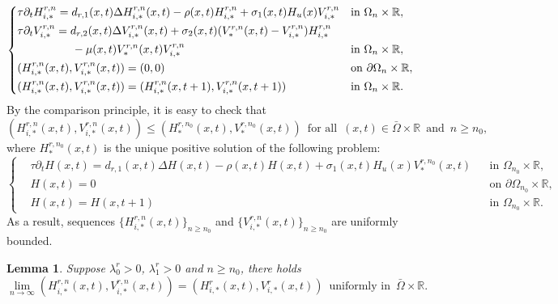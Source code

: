 \documentclass[11pt,reqno]{amsart}
\newtheorem{lemma}[theorem]{Lemma}
\numberwithin{equation}{section}
\begin{document}
\begin{equation}\label{4-16}
\left\{
\begin{aligned}
&\tau \partial_{t} H_{i,*}^{r,n}
= d_{r,1}(x,t)\Delta H_{i,*}^{r,n} (x,t)-\rho(x,t)H_{i,*}^{r,n} +\sigma_{1}(x,t)H_{u}(x)V_{i,*}^{r,n} && \text{in } \Omega_{n}\times\mathbb{R},
\\
&\tau \partial_{t} V_{i,*}^{r,n}
= d_{r,2}(x,t)\Delta V_{i,*}^{r,n} (x,t) + \sigma_{2}(x,t)(V^{r,n}_{*}(x,t) - V_{i,*}^{r,n})H_{i,*}^{r,n}\\ &\hspace{1.7cm}-\mu(x,t)V^{r,n}_{*}(x,t)V_{i,*}^{r,n} && \text{in } \Omega_{n}\times\mathbb{R},
\\
&( H_{i,*}^{r,n}(x,t), V_{i,*}^{r,n}(x,t)) = ( 0, 0) && \text{on } \partial\Omega_{n}\times\mathbb{R},
\\
&(H_{i,*}^{r,n}(x,t), V_{i,*}^{r,n}(x,t))=( H_{i,*}^{r,n}(x,t+1), V_{i,*}^{r,n}(x,t+1) ) && \text{in } \Omega_{n}\times\mathbb{R}.
\end{aligned}
\right.
\end{equation}
By the comparison principle, it is easy to check that
\begin{equation*}
( H_{i,*}^{r,n}(x,t), V_{i,*}^{r,n}(x,t) )
\leq
( H_{*}^{r,n_{0}}(x,t), V_{*}^{r,n_{0}}(x,t) )
\enspace\text{for all}\enspace (x,t)\in\bar{\Omega}\times\mathbb{R}
\enspace\text{and}\enspace n\geq n_{0},
\end{equation*}
where $H_{*}^{r,n_{0}}(x,t)$ is the unique positive solution of the following problem:
\begin{equation*}
\left\{
\begin{aligned}
&\tau\partial_{t} H(x,t) = d_{r,1}(x,t)\Delta H(x,t) - \rho(x,t)H(x,t) + \sigma_{1}(x,t)H_{u}(x)V^{r,n_{0}}_{*}(x,t)  && \text{in } \Omega_{n_{0}}\times\mathbb{R},\\
&H(x,t) = 0&& \text{on } \partial\Omega_{n_{0}}\times\mathbb{R},\\
&H(x,t) = H(x,t+1) && \text{in } \Omega_{n_{0}}\times\mathbb{R}.
\end{aligned}
\right.
\end{equation*}
As a result, sequences $\{ H_{i,*}^{r,n}(x,t) \}_{n\geq n_{0}} $ and $ \{V_{i,*}^{r,n}(x,t) \}_{n\geq n_{0}}$ are uniformly bounded.
%
%
\begin{lemma}\label{LEM8.5}
Suppose $\lambda_{0}^{r}>0$, $\lambda_{1}^{r}>0$ and $n\geq n_{0}$,
there holds
\begin{equation*}
\lim_{n\to\infty} ( H_{i,*}^{r,n}(x,t), V_{i,*}^{r,n}(x,t) ) = ( H_{i,*}^{r}(x,t), V_{i,*}^{r}(x,t)) \enspace\text{uniformly in}\enspace \bar{\Omega}\times\mathbb{R}.
\end{equation*}
\end{lemma}
\end{document}
